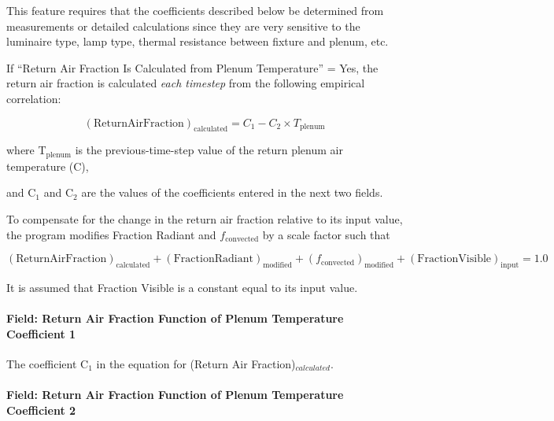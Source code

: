 This feature requires that the coefficients described below be determined from measurements or detailed calculations since they are very sensitive to the luminaire type, lamp type, thermal resistance between fixture and plenum, etc.

If ``Return Air Fraction Is Calculated from Plenum Temperature'' = Yes, the return air fraction is calculated \emph{each timestep} from the following empirical correlation:

\begin{equation}
  (\mathrm{Return Air Fraction})_{\mathrm{calculated}} = C_{1} - C_{2} \times T_{\mathrm{plenum}}
\end{equation}

where T\(_{\mathrm{plenum}}\) is the previous-time-step value of the return plenum air temperature (C),

and C\(_{1}\) and C\(_{2}\) are the values of the coefficients entered in the next two fields.

To compensate for the change in the return air fraction relative to its input value, the program modifies Fraction Radiant and \(f_{\mathrm{convected}}\) by a scale factor such that

\begin{equation}
  (\mathrm{Return Air Fraction})_{\mathrm{calculated}} + (\mathrm{Fraction Radiant})_{\mathrm{modified}} + (f_{\mathrm{convected}})_{\mathrm{modified}} + (\mathrm{Fraction Visible})_{\mathrm{input}} = 1.0
\end{equation}

It is assumed that Fraction Visible is a constant equal to its input value.

\paragraph{Field: Return Air Fraction Function of Plenum Temperature Coefficient 1}\label{field-return-air-fraction-function-of-plenum-temperature-coefficient-1-lights-definition}

The coefficient C\(_{1}\) in the equation for (Return Air Fraction)\(_{calculated}\).

\paragraph{Field: Return Air Fraction Function of Plenum Temperature Coefficient 2}\label{field-return-air-fraction-function-of-plenum-temperature-coefficient-2-lights-definition}

